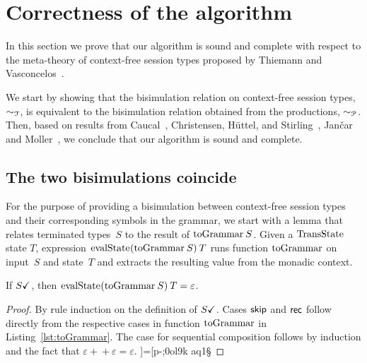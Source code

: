 \section{Correctness of the algorithm}
\label{sec:soundness}

In this section we prove that our algorithm is sound and complete
with respect to the meta-theory of context-free session types proposed
by Thiemann and Vasconcelos~\cite{thiemann2016context}.

We start by showing that the bisimulation relation on context-free
session types, $\sim_\mathcal T$, is equivalent to the bisimulation
relation obtained from the productions, $\sim_\mathcal P$.  Then, based on
results from Caucal~\cite{caucal1986decidabilite}, Christensen,
H{\"{u}}ttel, and Stirling~\cite{DBLP:journals/iandc/ChristensenHS95},
Jan{\v{c}}ar and Moller~\cite{janvcar1999techniques}, we conclude that
our algorithm is sound and complete.

\subsection{The two bisimulations coincide}

For the purpose of providing a bisimulation between context-free
session types and their corresponding symbols in the grammar, we start
with a lemma that relates terminated types~$S$ to the result of
$\toGrammarf S$.  Given a $\transStatek$ state $T$, expression
$\evalStatek (\toGrammarf S)\: T$ runs function $\toGrammark$ on
input~$S$ and state~$T$ and extracts the resulting value from the
monadic context.

\begin{lemma}
  \label{lem:terminated-togrammar}
  If $S\checkmark$, then $\evalStatek (\toGrammarf S)\: T=\varepsilon$.
\end{lemma}

\begin{proof}
  By rule induction on the definition of $S\checkmark$. Cases $\mathsf{skip}$ and
  $\mathsf{rec}$ follow directly from the respective cases in function
  $\toGrammark$ in Listing~\ref{lst:toGrammar}. The case for
  sequential composition follows by induction and the fact that
  $\varepsilon+\!\!+\varepsilon=\varepsilon$.
  ]=[p-;0ol9k aq1§
\end{proof}

